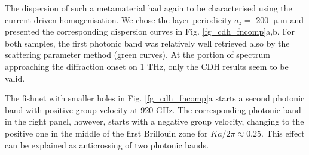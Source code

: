 The dispersion of such a metamaterial had again to be characterised using the current-driven homogenisation. We chose the layer periodicity $a_z = $ 200 $\upmu$m and presented the corresponding dispersion curves in Fig. \ref{fg_cdh_fncomp}a,b. For both samples, the first photonic band was relatively well retrieved also by the scattering parameter method (green curves). At the portion of spectrum approaching the diffraction onset on 1 THz, only the CDH results seem to be valid. 

The fishnet with smaller holes in Fig. \ref{fg_cdh_fncomp}a starts a second photonic band with positive group velocity at 920 GHz. The corresponding photonic band in the right panel, however, starts with a negative group velocity, changing to the positive one in the middle of the first Brillouin zone for $Ka/2\pi \approx 0.25$. This effect can be explained as anticrossing of two photonic bands. %



